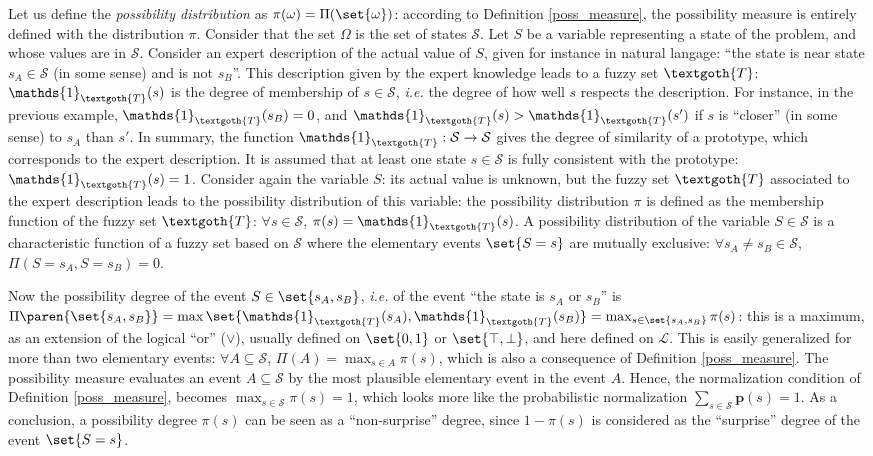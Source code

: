 Let us define the \textit{possibility distribution} as $\pi(\omega) = \Pi(\set{\omega})$:
according to Definition \ref{poss_measure},
the possibility measure is entirely defined with the distribution $\pi$.
Consider that the set $\Omega$ is the set of states $\mathcal{S}$.
Let $S$ be a variable representing a state of the problem, 
and whose values are in $\mathcal{S}$.
Consider an expert description of the actual value of $S$,
given for instance in natural langage: ``the state is near state $s_A \in \mathcal{S}$ (in some sense)
and is not $s_B$''.
This description given by the expert knowledge leads to a fuzzy set $\textgoth{T}$:
$\mathds{1}_{\textgoth{T}}(s)$ is the degree of membership of $s \in \mathcal{S}$,
\textit{i.e.} the degree of how well $s$ respects the description.
For instance, in the previous example, $\mathds{1}_{\textgoth{T}}(s_B) = 0$,
and $\mathds{1}_{\textgoth{T}}(s)  > \mathds{1}_{\textgoth{T}}(s')$
if $s$ is ``closer'' (in some sense) to $s_A$ than $s'$.
In summary, the function $\mathds{1}_{\textgoth{T}}: \mathcal{S} \rightarrow \mathcal{S}$ 
gives the degree of similarity of a prototype,
which corresponds to the expert description.
It is assumed that at least one state $s \in \mathcal{S}$
is fully consistent with the prototype: $\mathds{1}_{\textgoth{T}}(s) =1$.
Consider again the variable $S$:
its actual value is unknown, 
but the fuzzy set $\textgoth{T}$ associated to the expert description
leads to the possibility distribution of this variable:
the possibility distribution $\pi$ is defined as the membership function
of the fuzzy set $\textgoth{T}$:
$\forall s \in \mathcal{S}$, $\pi(s) = \mathds{1}_{\textgoth{T}}(s)$.
A possibility distribution of the variable $S \in \mathcal{S}$ 
is a characteristic function of a fuzzy set based on $\mathcal{S}$
where the elementary events $\set{ S = s }$ are mutually exclusive:
$\forall s_A \neq s_B \in \mathcal{S}$, $\Pi(S = s_A,  S = s_B) = 0$.
 
Now the possibility degree of the event $S \in \set{s_A,s_B}$,
\textit{i.e.} of the event ``the state is $s_A$ or $s_B$''
is $\Pi\paren{\set{ s_A,s_B }} = \max \set{ \mathds{1}_{\textgoth{T}}(s_A), \mathds{1}_{\textgoth{T}}(s_B) } = \max_{ s \in \set{ s_A,s_B } } \pi(s)$:
this is a maximum, as an extension of the logical ``or'' ($\vee$), 
usually defined on $\set{0,1}$ or $\set{ \top, \bot }$,
and here defined on $\mathcal{L}$.
This is easily generalized for more than two elementary events:
$\forall A \subseteq \mathcal{S}$, $\Pi(A) = \max_{s \in A} \pi(s)$,
which is also a consequence of Definition \ref{poss_measure}.
The possibility measure evaluates an event $A \subseteq \mathcal{S}$
by the most plausible elementary event in the event $A$.
Hence, the normalization condition of Definition \ref{poss_measure},
becomes $\max_{s \in \mathcal{S}} \pi(s) = 1$, 
which looks more like the probabilistic normalization $\sum_{s \in \mathcal{S}} \textbf{p}(s)=1$.
As a conclusion, a possibility degree $\pi(s)$ can be seen as a ``non-surprise'' degree,
since $1 - \pi(s)$ is considered as the ``surprise'' degree of the event $\set{S = s}$.

